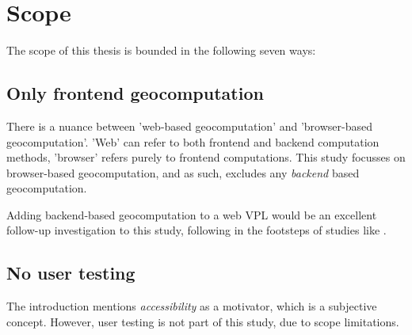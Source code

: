 
\section{Scope}
The scope of this thesis is bounded in the following seven ways: 

\subsection*{Only frontend geocomputation}

There is a nuance between 'web-based geocomputation' and 'browser-based geocomputation'. 
'Web' can refer to both frontend and backend computation methods, 'browser' refers purely to frontend computations. 
This study focusses on browser-based geocomputation, and as such, excludes any \emph {backend} based geocomputation.

Adding backend-based geocomputation to a web VPL would be an excellent 
follow-up investigation to this study, following in the footsteps of studies like \cite{panidi_hybrid_2015}.

\subsection*{No user testing} %

The introduction mentions \emph{accessibility} as a motivator, which is a subjective concept.
However, user testing is not part of this study, due to scope limitations. 

